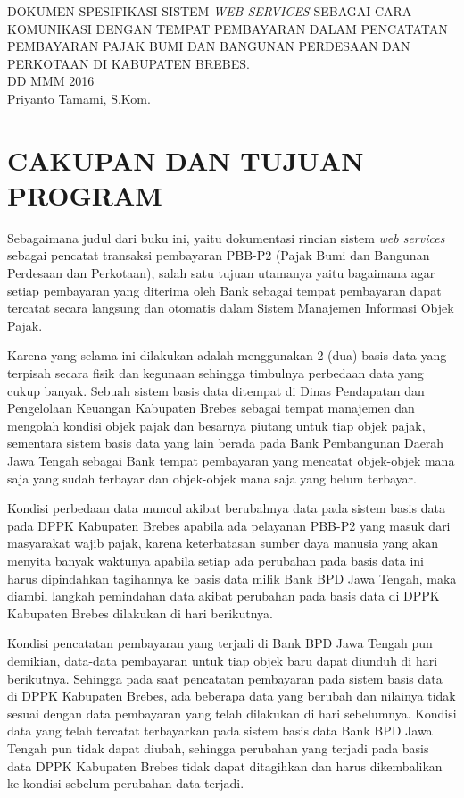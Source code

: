 \documentclass[pdftex,12pt, oneside]{article}
\begin{document}
\sloppy

\begin{center}
{\large DOKUMEN SPESIFIKASI SISTEM \textit{WEB SERVICES} SEBAGAI CARA KOMUNIKASI DENGAN TEMPAT PEMBAYARAN DALAM PENCATATAN PEMBAYARAN PAJAK BUMI DAN BANGUNAN PERDESAAN DAN PERKOTAAN DI KABUPATEN BREBES.}
\\[1cm]
DD MMM 2016\\
Priyanto Tamami, S.Kom.
\end{center}

\section{CAKUPAN DAN TUJUAN PROGRAM}

Sebagaimana judul dari buku ini, yaitu dokumentasi rincian sistem \textit{web services} sebagai pencatat transaksi pembayaran PBB-P2 (Pajak Bumi dan Bangunan Perdesaan dan Perkotaan), salah satu tujuan utamanya yaitu bagaimana agar setiap pembayaran yang diterima oleh Bank sebagai tempat pembayaran dapat tercatat secara langsung dan otomatis dalam Sistem Manajemen Informasi Objek Pajak.

Karena yang selama ini dilakukan adalah menggunakan 2 (dua) basis data yang terpisah secara fisik dan kegunaan sehingga timbulnya perbedaan data yang cukup banyak. Sebuah sistem basis data ditempat di Dinas Pendapatan dan Pengelolaan Keuangan Kabupaten Brebes sebagai tempat manajemen dan mengolah kondisi objek pajak dan besarnya piutang untuk tiap objek pajak, sementara sistem basis data yang lain berada pada Bank Pembangunan Daerah Jawa Tengah sebagai Bank tempat pembayaran yang mencatat objek-objek mana saja yang sudah terbayar dan objek-objek mana saja yang belum terbayar.

Kondisi perbedaan data muncul akibat berubahnya data pada sistem basis data pada DPPK Kabupaten Brebes apabila ada pelayanan PBB-P2 yang masuk dari masyarakat wajib pajak, karena keterbatasan sumber daya manusia yang akan menyita banyak waktunya apabila setiap ada perubahan pada basis data ini harus dipindahkan tagihannya ke basis data milik Bank BPD Jawa Tengah, maka diambil langkah pemindahan data akibat perubahan pada basis data di DPPK Kabupaten Brebes dilakukan di hari berikutnya.

Kondisi pencatatan pembayaran yang terjadi di Bank BPD Jawa Tengah pun demikian, data-data pembayaran untuk tiap objek baru dapat diunduh di hari berikutnya. Sehingga pada saat pencatatan pembayaran pada sistem basis data di DPPK Kabupaten Brebes, ada beberapa data yang berubah dan nilainya tidak sesuai dengan data pembayaran yang telah dilakukan di hari sebelumnya. Kondisi data yang telah tercatat terbayarkan pada sistem basis data Bank BPD Jawa Tengah pun tidak dapat diubah, sehingga perubahan yang terjadi pada basis data DPPK Kabupaten Brebes tidak dapat ditagihkan dan harus dikembalikan ke kondisi sebelum perubahan data terjadi.
\end{document}
